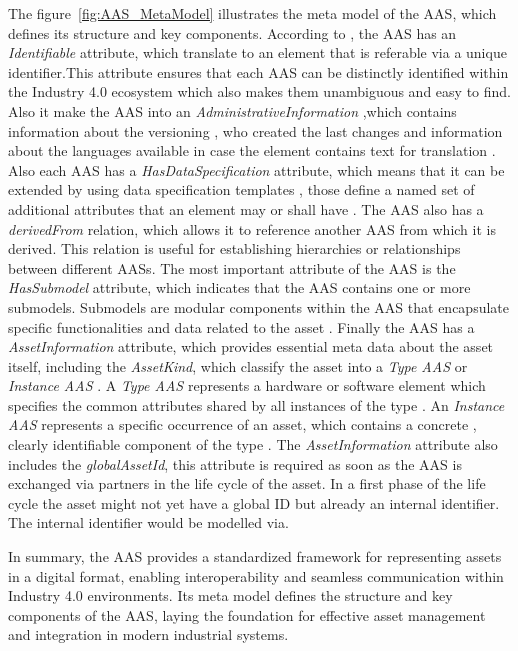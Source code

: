 The figure~\ref{fig:AAS_MetaModel} illustrates the meta model of the \ac{AAS},
which defines its structure and key components.
According to \cite{plattformi40_aas_part1_v3}, the \ac{AAS} has an \textit{Identifiable} attribute, which translate to an element
that is referable via a unique identifier.This attribute ensures that each \ac{AAS} can be distinctly identified within the Industry 4.0 ecosystem which also makes them unambiguous and easy to find.
Also it make the \ac{AAS} into an \textit{AdministrativeInformation} ,which contains information about the versioning , who created the last changes and information about the languages available in case the element contains text for translation \cite{plattformi40_aas_part1_v3}.
Also each \ac{AAS} has a \textit{HasDataSpecification} attribute, which means that it can be extended by using data specification templates , those define a named set of additional attributes that
an element may or shall have \cite{plattformi40_aas_part1_v3}.
The \ac{AAS} also has a \textit{derivedFrom} relation, which allows it to reference another \ac{AAS} from which it is derived.
This relation is useful for establishing hierarchies or relationships between different \ac{AAS}s.
The most important attribute of the \ac{AAS} is the \textit{HasSubmodel} attribute,
which indicates that the \ac{AAS} contains one or more submodels.
Submodels are modular components within the \ac{AAS} that encapsulate specific functionalities
and data related to the asset \cite{plattformi40_aas_part1_v3}.
Finally the \ac{AAS} has a \textit{AssetInformation} attribute, which provides essential meta data about the asset itself,
including the \textit{AssetKind}, which classify the asset into a \textit{Type AAS} or \textit{Instance AAS} \cite{plattformi40_aas_part1_v3}.
A \textit{Type AAS} represents a hardware or software element which specifies the common attributes shared
by all instances of the type \cite{plattformi40_aas_part1_v3}.
An \textit{Instance AAS} represents a specific occurrence of an asset,
which contains a concrete , clearly identifiable component of the type \cite{plattformi40_aas_part1_v3}.
The \textit{AssetInformation} attribute also includes the \textit{globalAssetId}, this attribute is required as soon as the AAS is
exchanged via partners in the life cycle of the asset.
In a first phase of the life cycle the asset might not yet
have a global ID but already an internal identifier. The
internal identifier would be modelled via\cite{plattformi40_aas_part1_v3}.

In summary, the \ac{AAS} provides a standardized framework for representing assets in a digital format,
enabling interoperability and seamless communication within Industry 4.0 environments.
Its meta model defines the structure and key components of the \ac{AAS},
laying the foundation for effective asset management and integration in modern industrial systems.

